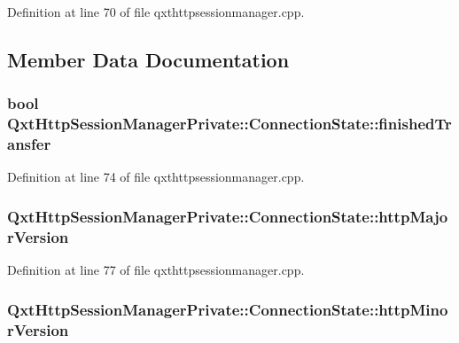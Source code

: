 Definition at line 70 of file qxthttpsessionmanager.\-cpp.



\subsection{Member Data Documentation}
\hypertarget{struct_qxt_http_session_manager_private_1_1_connection_state_adabc4a155cc3195b04b0b2398d3030e0}{
\subsubsection[{finished\-Transfer}]{\setlength{\rightskip}{0pt plus 5cm}bool Qxt\-Http\-Session\-Manager\-Private\-::\-Connection\-State\-::finished\-Transfer}}\label{struct_qxt_http_session_manager_private_1_1_connection_state_adabc4a155cc3195b04b0b2398d3030e0}


Definition at line 74 of file qxthttpsessionmanager.\-cpp.

\hypertarget{struct_qxt_http_session_manager_private_1_1_connection_state_ab92eee2c71650b2385079c1fc2af24ee}{
\subsubsection[{http\-Major\-Version}]{ Qxt\-Http\-Session\-Manager\-Private\-::\-Connection\-State\-::http\-Major\-Version}}\label{struct_qxt_http_session_manager_private_1_1_connection_state_ab92eee2c71650b2385079c1fc2af24ee}


Definition at line 77 of file qxthttpsessionmanager.\-cpp.

\hypertarget{struct_qxt_http_session_manager_private_1_1_connection_state_aaf604b5aaa45176893d82d4014642dca}{
\subsubsection[{http\-Minor\-Version}]{ Qxt\-Http\-Session\-Manager\-Private\-::\-Connection\-State\-::http\-Minor\-Version}}\label{struct_qxt_http_session_manager_private_1_1_connection_state_aaf604b5aaa45176893d82d4014642dca}


